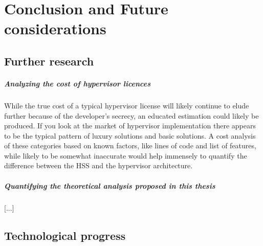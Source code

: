 
\chapter{Conclusion and Future considerations} %

\label{Chapter6} %


\newcommand{\keyword}[1]{\textbf{#1}}
\newcommand{\tabhead}[1]{\textbf{#1}}
\newcommand{\code}[1]{\texttt{#1}}
\newcommand{\file}[1]{\texttt{\bfseries#1}}
\newcommand{\option}[1]{\texttt{\itshape#1}}


\section{Further research}
\paragraph{Analyzing the cost of hypervisor licences}
While the true cost of a typical hypervisor license will likely continue to elude further because of the developer's secrecy, an educated estimation could likely be produced. If you look at the market of hypervisor implementation there appears to be the typical pattern of luxury solutions and basic solutions. A cost analysis of these categories based on known factors, like lines of code and list of features, while likely to be somewhat inaccurate would help immensely to quantify the difference between the \gls{HSS} and the hypervisor architecture.
\paragraph{Quantifying the theoretical analysis proposed in this thesis}
[...]

\section{Technological progress} \label{tech-progress}
